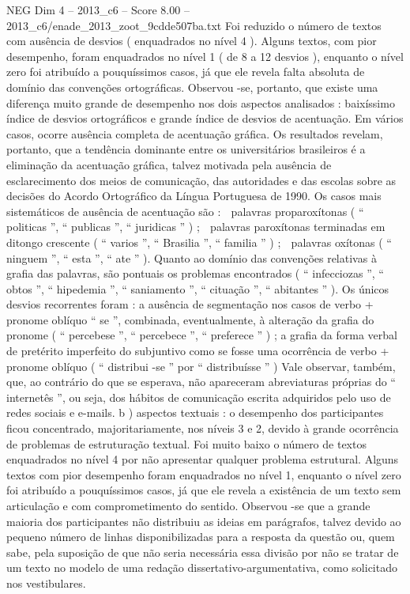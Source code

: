 \begin{textsample}{NEG Dim 4 – 2013\_c6 – Score 8.00 – 2013\_c6/enade\_2013\_zoot\_9cdde507ba.txt}
Foi reduzido o número de textos com ausência de desvios ( enquadrados no nível 4 ).
Alguns textos, com pior desempenho, foram enquadrados no nível 1 ( de 8 a 12 desvios ), enquanto o nível zero foi atribuído a pouquíssimos casos, já que ele revela falta absoluta de domínio das convenções ortográficas.
Observou -se, portanto, que existe uma diferença muito grande de desempenho nos dois aspectos analisados : baixíssimo índice de desvios ortográficos e grande índice de desvios de acentuação.
Em vários casos, ocorre ausência completa de acentuação gráfica.
Os resultados revelam, portanto, que a tendência dominante entre os universitários brasileiros é a eliminação da acentuação gráfica, talvez motivada pela ausência de esclarecimento dos meios de comunicação, das autoridades e das escolas sobre as decisões do Acordo Ortográfico da Língua Portuguesa de 1990.
Os casos mais sistemáticos de ausência de acentuação são :  palavras proparoxítonas ( “ politicas ”, “ publicas ”, “ juridicas ” ) ;  palavras paroxítonas terminadas em ditongo crescente ( “ varios ”, “ Brasilia ”, “ familia ” ) ;  palavras oxítonas ( “ ninguem ”, “ esta ”, “ ate ” ).
Quanto ao domínio das convenções relativas à grafia das palavras, são pontuais os problemas encontrados ( “ infecciozas ”, “ obtos ”, “ hipedemia ”, “ saniamento ”, “ cituação ”, “ abitantes ” ).
Os únicos desvios recorrentes foram : a ausência de segmentação nos casos de verbo + pronome oblíquo “ se ”, combinada, eventualmente, à alteração da grafia do pronome ( “ percebese ”, “ percebece ”, “ preferece ” ) ; a grafia da forma verbal de pretérito imperfeito do subjuntivo como se fosse uma ocorrência de verbo + pronome oblíquo ( “ distribui -se ” por “ distribuísse ” ) Vale observar, também, que, ao contrário do que se esperava, não apareceram abreviaturas próprias do “ internetês ”, ou seja, dos hábitos de comunicação escrita adquiridos pelo uso de redes sociais e e-mails. b ) aspectos textuais : o desempenho dos participantes ficou concentrado, majoritariamente, nos níveis 3 e 2, devido à grande ocorrência de problemas de estruturação textual.
Foi muito baixo o número de textos enquadrados no nível 4 por não apresentar qualquer problema estrutural.
Alguns textos com pior desempenho foram enquadrados no nível 1, enquanto o nível zero foi atribuído a pouquíssimos casos, já que ele revela a existência de um texto sem articulação e com comprometimento do sentido.
Observou -se que a grande maioria dos participantes não distribuiu as ideias em parágrafos, talvez devido ao pequeno número de linhas disponibilizadas para a resposta da questão ou, quem sabe, pela suposição de que não seria necessária essa divisão por não se tratar de um texto no modelo de uma redação dissertativo-argumentativa, como solicitado nos vestibulares.

\end{textsample}
